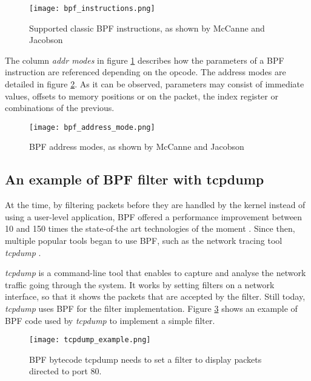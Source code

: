 \begin{figure}[htbp]
	\centering
	\texttt{[image: bpf\_instructions.png]}
	\caption{Supported classic BPF instructions, as shown by McCanne and Jacobson \cite{bpf_bsd_origin_bpf_page7}}
	\label{fig:bpf_instructions}
\end{figure}

The column \textit{addr modes} in figure \ref{fig:bpf_instructions} describes how the parameters of a BPF instruction are referenced depending on the opcode. The address modes are detailed in figure \ref{fig:bpf_address_mode}. As it can be observed, parameters may consist of immediate values, offsets to memory positions or on the packet, the index register or combinations of the previous.

\begin{figure}[htbp]
	\centering
	\texttt{[image: bpf\_address\_mode.png]}
	\caption{BPF address modes, as shown by McCanne and Jacobson \cite{bpf_bsd_origin_bpf_page8}}
	\label{fig:bpf_address_mode}
\end{figure}

\subsection{An example of BPF filter with tcpdump} \label{subsection:tcpdump}
At the time, by filtering packets before they are handled by the kernel instead of using a user-level application, BPF offered a performance improvement between 10 and 150 times the state-of-the art technologies of the moment \cite{bpf_bsd_origin_bpf_page1}. Since then, multiple popular tools began to use BPF, such as the network tracing tool \textit{tcpdump} \cite{tcpdump_page}.

\textit{tcpdump} is a command-line tool that enables to capture and analyse the network traffic going through the system. It works by setting filters on a network interface, so that it shows the packets that are accepted by the filter. Still today, \textit{tcpdump} uses BPF for the filter implementation. Figure \ref{fig:bpf_tcpdump_example} shows an example of BPF code used by \textit{tcpdump} to implement a simple filter.

\begin{figure}[htbp]
	\centering
	\texttt{[image: tcpdump\_example.png]}
	\caption{BPF bytecode tcpdump needs to set a filter to display packets directed to port 80.}
	\label{fig:bpf_tcpdump_example}
\end{figure}

